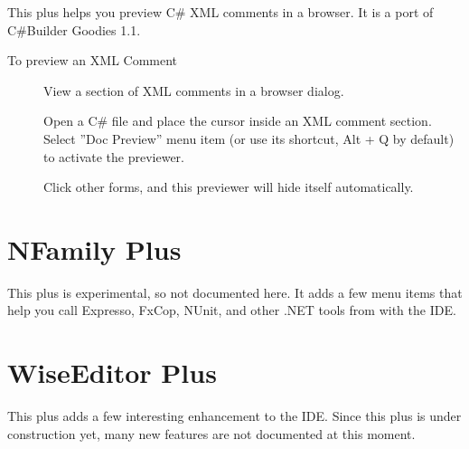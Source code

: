 This plus helps you preview C\# XML comments in a browser. It is a port of
C\#Builder Goodies 1.1.

\begin{description}
\item[To preview an XML Comment] View a section of XML comments in a browser dialog.

Open a C\# file and place the cursor inside an XML comment section. Select
''Doc Preview'' menu item (or use its shortcut, Alt + Q by default) to activate
the previewer.


Click other forms, and this previewer will hide itself automatically.

\end{description}

\section{NFamily Plus}

This plus is experimental, so not documented here. It adds a few menu items that
help you call Expresso, FxCop, NUnit, and other .NET tools from with the IDE.

\section{WiseEditor Plus}

This plus adds a few interesting enhancement to the IDE. Since this plus is
under construction yet, many new features are not documented at this moment.

